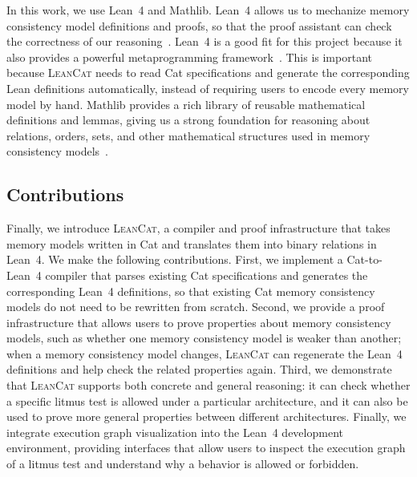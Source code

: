 In this work, we use Lean~4 and Mathlib. Lean~4 allows us to mechanize memory consistency model definitions and proofs, so that the proof assistant can check the correctness of our reasoning~\cite{deMoura2021lean4}. Lean~4 is a good fit for this project because it also provides a powerful metaprogramming framework~\cite{10.1145/3110278Lean4Meta}. This is important because \textsc{LeanCat} needs to read Cat specifications and generate the corresponding Lean definitions automatically, instead of requiring users to encode every memory model by hand. Mathlib provides a rich library of reusable mathematical definitions and lemmas, giving us a strong foundation for reasoning about relations, orders, sets, and other mathematical structures used in memory consistency models~\cite{mathlib2020}.

\subsection{Contributions}

Finally, we introduce \textsc{LeanCat}, a compiler and proof infrastructure that takes memory models written in Cat and translates them into binary relations in Lean~4. We make the following contributions. First, we implement a Cat-to-Lean~4 compiler that parses existing Cat specifications and generates the corresponding Lean~4 definitions, so that existing Cat memory consistency models do not need to be rewritten from scratch. Second, we provide a proof infrastructure that allows users to prove properties about memory consistency models, such as whether one memory consistency model is weaker than another; when a memory consistency model changes, \textsc{LeanCat} can regenerate the Lean~4 definitions and help check the related properties again. Third, we demonstrate that \textsc{LeanCat} supports both concrete and general reasoning: it can check whether a specific litmus test is allowed under a particular architecture, and it can also be used to prove more general properties between different architectures. Finally, we integrate execution graph visualization into the Lean~4 development environment, providing interfaces that allow users to inspect the execution graph of a litmus test and understand why a behavior is allowed or forbidden.